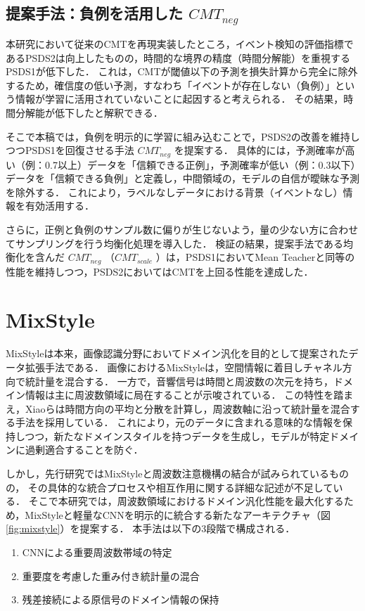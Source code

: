 \documentclass[main]{subfiles}
\begin{document}
\subsection{提案手法：負例を活用した $CMT_{neg}$}
本研究において従来のCMTを再現実装したところ，イベント検知の評価指標であるPSDS2は向上したものの，時間的な境界の精度（時間分解能）を重視するPSDS1が低下した．
これは，CMTが閾値以下の予測を損失計算から完全に除外するため，確信度の低い予測，すなわち「イベントが存在しない（負例）」という情報が学習に活用されていないことに起因すると考えられる．
その結果，時間分解能が低下したと解釈できる．\par
そこで本稿では，負例を明示的に学習に組み込むことで，PSDS2の改善を維持しつつPSDS1を回復させる手法 $CMT_{neg}$ を提案する．
具体的には，予測確率が高い（例：0.7以上）データを「信頼できる正例」，予測確率が低い（例：0.3以下）データを「信頼できる負例」と定義し，中間領域の，モデルの自信が曖昧な予測を除外する．
これにより，ラベルなしデータにおける背景（イベントなし）情報を有効活用する．\par
さらに，正例と負例のサンプル数に偏りが生じないよう，量の少ない方に合わせてサンプリングを行う均衡化処理を導入した．
検証の結果，提案手法である均衡化を含んだ $CMT_{neg}$ （$CMT_{scale}$ ）は，PSDS1においてMean Teacherと同等の性能を維持しつつ，PSDS2においてはCMTを上回る性能を達成した．\par


\section{MixStyle}
\label{提案手法:MixStyle}

MixStyleは本来，画像認識分野においてドメイン汎化を目的として提案されたデータ拡張手法である．
画像におけるMixStyleは，空間情報に着目しチャネル方向で統計量を混合する．
一方で，音響信号は時間と周波数の次元を持ち，ドメイン情報は主に周波数領域に局在することが示唆されている\cite{kim2022domain}．
この特性を踏まえ，Xiaoら\cite{xiao2024fmsg}は時間方向の平均と分散を計算し，周波数軸に沿って統計量を混合する手法を採用している．
これにより，元のデータに含まれる意味的な情報を保持しつつ，新たなドメインスタイルを持つデータを生成し，モデルが特定ドメインに過剰適合することを防ぐ．\par

しかし，先行研究\cite{xiao2024fmsg}ではMixStyleと周波数注意機構の結合が試みられているものの，
その具体的な統合プロセスや相互作用に関する詳細な記述が不足している．
そこで本研究では，周波数領域におけるドメイン汎化性能を最大化するため，MixStyleと軽量なCNNを明示的に統合する新たなアーキテクチャ（図\ref{fig:mixstyle}）を提案する．
本手法は以下の3段階で構成される． 
\begin{enumerate}
\item CNNによる重要周波数帯域の特定 
\item 重要度を考慮した重み付き統計量の混合 
\item 残差接続による原信号のドメイン情報の保持 
\end{enumerate}
\end{document}
